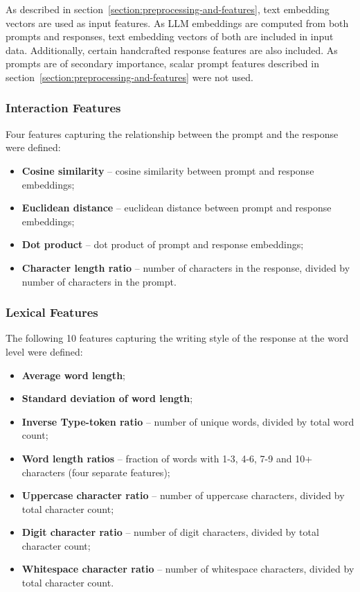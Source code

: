 \documentclass[a4paper,11pt,twoside]{report}
\theoremstyle{definition}
\begin{document}
As described in section~\ref{section:preprocessing-and-features}, text embedding vectors are used as input features. As LLM embeddings are computed from both prompts and responses, text embedding vectors of both are included in input data. Additionally, certain handcrafted response features are also included. As prompts are of secondary importance, scalar prompt features described in section~\ref{section:preprocessing-and-features} were not used.

\subsubsection{Interaction Features}

Four features capturing the relationship between the prompt and the response were defined:

\begin{itemize}
    \item \textbf{Cosine similarity} -- cosine similarity between prompt and response embeddings;
    \item \textbf{Euclidean distance} -- euclidean distance between prompt and response embeddings;
    \item \textbf{Dot product} -- dot product of prompt and response embeddings;
    \item \textbf{Character length ratio} -- number of characters in the response, divided by number of characters in the prompt.
\end{itemize}

\subsubsection{Lexical Features}

The following 10 features capturing the writing style of the response at the word level were defined:

\begin{itemize}
    \item \textbf{Average word length};
    \item \textbf{Standard deviation of word length};
    \item \textbf{Inverse Type-token ratio} -- number of unique words, divided by total word count;
    \item \textbf{Word length ratios} -- fraction of words with 1-3, 4-6, 7-9 and 10+ characters (four separate features);
    \item \textbf{Uppercase character ratio} -- number of uppercase characters, divided by total character count;
    \item \textbf{Digit character ratio} -- number of digit characters, divided by total character count;
    \item \textbf{Whitespace character ratio} -- number of whitespace characters, divided by total character count.
\end{itemize}
\end{document}
